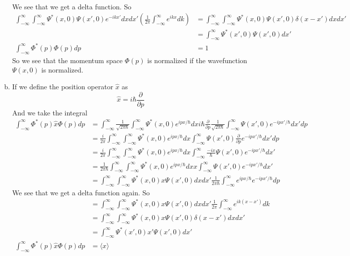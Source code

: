 \documentclass[11pt]{article}
\numberwithin{equation}{section}
\newcommand{\expt}[1]{\langle{#1}\rangle}
\begin{document}
\begin{enumerate}[(a)]
\begin{align*}
\end{align*}
We see that we get a delta function. So
\begin{align*}
\int_{-\infty}^{\infty}\int_{-\infty}^{\infty}\Psi^*(x,0)\Psi(x',0)e^{-ikx'}dxdx'\left(\frac{1}{2\pi}\int_{-\infty}^{\infty}e^{ikx}dk\right) &= \int_{-\infty}^{\infty}\int_{-\infty}^{\infty}\Psi^*(x,0)\Psi(x',0)\delta(x-x')dxdx'\\
&= \int_{-\infty}^{\infty}\Psi^*(x',0)\Psi(x',0)dx'\\
\int_{-\infty}^{\infty}\Phi^*(p)\Phi(p)dp &= 1
\end{align*}
So we see that the momentum space $\Phi(p)$ is normalized if the wavefunction $\Psi(x,0)$ is normalized.

\item
If we define the position operator $\hat{x}$ as
$$\hat{x}=i\hbar\frac{\partial}{\partial p}$$
And we take the integral 
\begin{align*}
\int_{-\infty}^{\infty}\Phi^*(p)\hat{x}\Phi(p)dp &= \int_{-\infty}^{\infty}\frac{1}{\sqrt{2\pi\hbar}}\int_{-\infty}^{\infty}\Psi^*(x,0)e^{ipx/\hbar}dx i\hbar\frac{\partial}{\partial p}\frac{1}{\sqrt{2\pi\hbar}}\int_{-\infty}^{\infty}\Psi(x',0)e^{-ipx'/\hbar}dx'dp\\
&= \frac{i}{2\pi}\int_{-\infty}^{\infty}\int_{-\infty}^{\infty}\Psi^*(x,0)e^{ipx/\hbar}dx \int_{-\infty}^{\infty}\Psi(x',0)\frac{\partial}{\partial p}e^{-ipx'/\hbar}dx'dp\\
&= \frac{i}{2\pi}\int_{-\infty}^{\infty}\int_{-\infty}^{\infty}\Psi^*(x,0)e^{ipx/\hbar}dx \int_{-\infty}^{\infty}\frac{-ix}{\hbar}\Psi(x',0)e^{-ipx'/\hbar}dx'\\
&= \frac{1}{2\pi\hbar}\int_{-\infty}^{\infty}\int_{-\infty}^{\infty}\Psi^*(x,0)e^{ipx/\hbar}dx x\int_{-\infty}^{\infty}\Psi(x',0)e^{-ipx'/\hbar}dx'\\
&= \int_{-\infty}^{\infty}\int_{-\infty}^{\infty}\Psi^*(x,0)x\Psi(x',0)dxdx'\frac{1}{2\pi\hbar}\int_{-\infty}^{\infty}e^{ipx/\hbar}e^{-ipx'/\hbar}dp
\end{align*}
We see that we get a delta function again. So
\begin{align*}
&= \int_{-\infty}^{\infty}\int_{-\infty}^{\infty}\Psi^*(x,0)x\Psi(x',0)dxdx'\frac{1}{2\pi}\int_{-\infty}^{\infty}e^{ik(x-x')}dk\\
&= \int_{-\infty}^{\infty}\int_{-\infty}^{\infty}\Psi^*(x,0)x\Psi(x',0)\delta(x-x')dxdx'\\
&= \int_{-\infty}^{\infty}\Psi^*(x',0)x'\Psi(x',0)dx'\\
\int_{-\infty}^{\infty}\Phi^*(p)\hat{x}\Phi(p)dp &= \expt{x}
\end{align*}


\end{enumerate}
\end{document}
